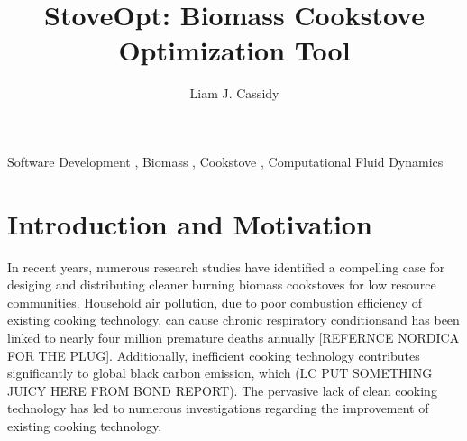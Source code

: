 \documentclass[3p,times,twocolumn]{elsarticle}
\begin{document}
\begin{frontmatter}



\dochead{}

\title{StoveOpt: Biomass Cookstove Optimization Tool}


\author{Liam J. Cassidy}

\address{2000 SW Monroe Ave, 342 Rogers Hall, Covallis, OR 97331}


\begin{abstract}
\end{abstract}

\begin{keyword}


Software Development \sep%
Biomass \sep%
Cookstove \sep%
Computational Fluid Dynamics
\end{keyword}


\end{frontmatter}


\section{Introduction and Motivation}
In recent years, numerous research studies have identified a compelling case for desiging and distributing cleaner burning biomass cookstoves for low resource communities. Household air pollution, due to poor combustion efficiency of existing cooking technology, can cause chronic respiratory conditionsand has been linked to nearly four million premature deaths annually [REFERNCE NORDICA FOR THE PLUG]. Additionally, inefficient cooking technology contributes significantly to global black carbon emission, which (LC PUT SOMETHING JUICY HERE FROM BOND REPORT). The pervasive lack of clean cooking technology has led to numerous investigations regarding the improvement of existing cooking technology.
\end{document}
